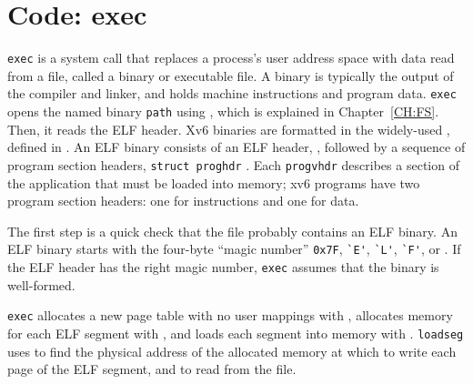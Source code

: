 \section{Code: exec}
\lstinline{exec} is a system call that replaces a process's
user address space with data read from a file, called a binary
or executable file.
A binary is typically the output of the compiler and linker,
and holds machine instructions and program data.
\lstinline{exec}  opens the
named binary \lstinline{path} using 
, which is explained in
Chapter~\ref{CH:FS}.  Then, it reads the ELF header. Xv6 binaries
are formatted in the widely-used , defined in
.  An ELF binary consists of an ELF header,
 ,
followed by a sequence of program section headers,
\lstinline{struct proghdr} .  Each
\lstinline{progvhdr} describes a section of the application that must
be loaded into memory; xv6 programs have two program section
headers: one for instructions and one for data.

The first step is a quick check that the file probably contains an
ELF binary.
An ELF binary starts with the four-byte ``magic number''
\lstinline{0x7F},
\lstinline{`E'},
\lstinline{`L'},
\lstinline{`F'},
or
.
If the ELF header has the right magic number,
\lstinline{exec}
assumes that the binary is well-formed.

\lstinline{exec}
allocates a new page table with no user mappings with
,
allocates memory for each ELF segment with
,
and loads each segment into memory with
.
\lstinline{loadseg}
uses
to find the physical address of the allocated memory at which to write
each page of the ELF segment, and
to read from the file.

